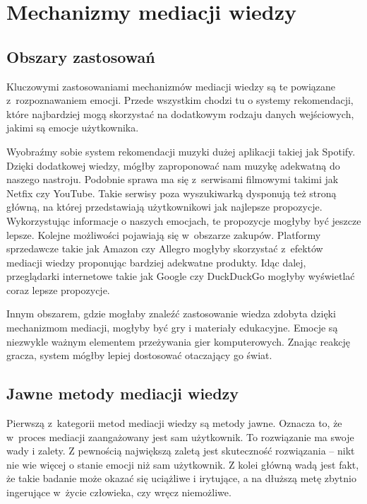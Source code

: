 \chapter{Mechanizmy mediacji wiedzy}
\label{cha:mechanizmyMediacjiWiedzy}


\section{Obszary zastosowań}
\label{sec:obszaryZastosowan}

Kluczowymi zastosowaniami mechanizmów mediacji wiedzy są te powiązane z~rozpoznawaniem emocji. Przede wszystkim chodzi tu o systemy rekomendacji, które najbardziej mogą skorzystać na dodatkowym rodzaju danych wejściowych, jakimi są emocje użytkownika. 

Wyobraźmy sobie system rekomendacji muzyki dużej aplikacji takiej jak Spotify. Dzięki dodatkowej wiedzy, mógłby zaproponować nam muzykę adekwatną do naszego nastroju. Podobnie sprawa ma się z~serwisami filmowymi takimi jak Netfix czy YouTube. Takie serwisy poza wyszukiwarką dysponują też stroną główną, na której przedstawiają użytkownikowi jak najlepsze propozycje. Wykorzystując informacje o naszych emocjach, te propozycje mogłyby być jeszcze lepsze. Kolejne możliwości pojawiają się w~obszarze zakupów. Platformy sprzedawcze takie jak Amazon czy Allegro mogłyby skorzystać z~efektów mediacji wiedzy proponując bardziej adekwatne produkty. Idąc dalej, przeglądarki internetowe takie jak Google czy DuckDuckGo mogłyby wyświetlać coraz lepsze propozycje.

Innym obszarem, gdzie mogłaby znaleźć zastosowanie wiedza zdobyta dzięki mechanizmom mediacji, mogłyby być gry i materiały edukacyjne. Emocje są niezwykle ważnym elementem przeżywania gier komputerowych. Znając reakcję gracza, system mógłby lepiej dostosować otaczający go świat.


\section{Jawne metody mediacji wiedzy}
\label{sec:jawneMetodyMediacjiWiedzy}

Pierwszą z~kategorii metod mediacji wiedzy są metody jawne. Oznacza to, że w~proces mediacji zaangażowany jest sam użytkownik. To rozwiązanie ma swoje wady i zalety. Z pewnością największą zaletą jest skuteczność rozwiązania -- nikt nie wie więcej o stanie emocji niż sam użytkownik. Z kolei główną wadą jest fakt, że takie badanie może okazać się uciążliwe i irytujące, a na dłuższą metę zbytnio ingerujące w~życie człowieka, czy wręcz niemożliwe.

